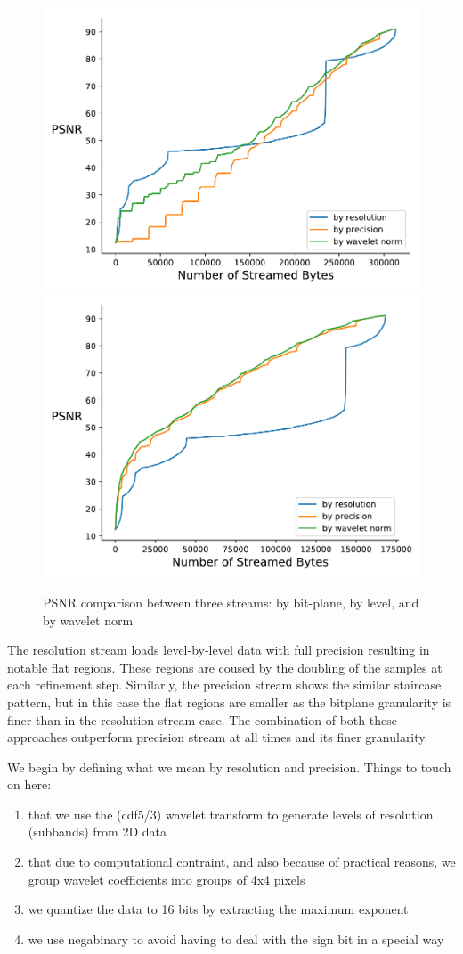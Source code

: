 \begin{figure}[htb!]
	\centering
	{\includegraphics[width=0.4\linewidth]{img/independent/rmse-miranda-viscosity}}
	{\includegraphics[width=0.4\linewidth]{img/skip-zeros/rmse-miranda-viscosity}}
	\caption {PSNR comparison between three streams: by bit-plane, by level, and by wavelet norm}
	\label{fig:psnr_traditional_vs_by_norm_viscosity}
\end{figure}



The resolution stream loads level-by-level data with full precision resulting in notable flat regions. These
regions are coused by the doubling of the samples at each refinement step. Similarly, the precision stream
shows the similar staircase pattern, but in this case the flat regions are smaller as the bitplane granularity
is finer than in the resolution stream case. The combination of both these approaches outperform precision
stream at all times and its finer granularity.

We begin by defining what we mean by resolution and precision. Things to touch on here:

\begin{enumerate}
  \item that we use the (cdf5/3) wavelet transform to generate levels of resolution (subbands) from 2D data
  \item that due to computational contraint, and also because of practical reasons, we group wavelet coefficients into groups of 4x4 pixels
  \item we quantize the data to 16 bits by extracting the maximum exponent
  \item we use negabinary to avoid having to deal with the sign bit in a special way
\end{enumerate}


